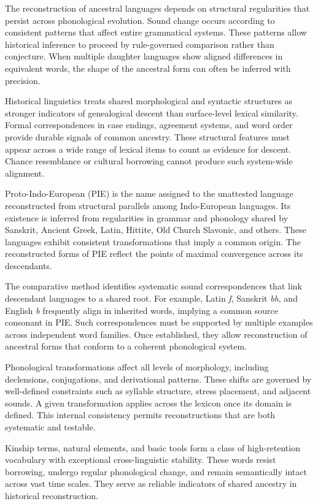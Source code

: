 
The reconstruction of ancestral languages depends on structural regularities that persist across phonological evolution. Sound change occurs according to consistent patterns that affect entire grammatical systems. These patterns allow historical inference to proceed by rule-governed comparison rather than conjecture. When multiple daughter languages show aligned differences in equivalent words, the shape of the ancestral form can often be inferred with precision.

Historical linguistics treats shared morphological and syntactic structures as stronger indicators of genealogical descent than surface-level lexical similarity. Formal correspondences in case endings, agreement systems, and word order provide durable signals of common ancestry. These structural features must appear across a wide range of lexical items to count as evidence for descent. Chance resemblance or cultural borrowing cannot produce such system-wide alignment.

Proto-Indo-European (PIE) is the name assigned to the unattested language reconstructed from structural parallels among Indo-European languages. Its existence is inferred from regularities in grammar and phonology shared by Sanskrit, Ancient Greek, Latin, Hittite, Old Church Slavonic, and others. These languages exhibit consistent transformations that imply a common origin. The reconstructed forms of PIE reflect the points of maximal convergence across its descendants.

The comparative method identifies systematic sound correspondences that link descendant languages to a shared root. For example, Latin \emph{f}, Sanskrit \emph{bh}, and English \emph{b} frequently align in inherited words, implying a common source consonant in PIE. Such correspondences must be supported by multiple examples across independent word families. Once established, they allow reconstruction of ancestral forms that conform to a coherent phonological system.

Phonological transformations affect all levels of morphology, including declensions, conjugations, and derivational patterns. These shifts are governed by well-defined constraints such as syllable structure, stress placement, and adjacent sounds. A given transformation applies across the lexicon once its domain is defined. This internal consistency permits reconstructions that are both systematic and testable.

Kinship terms, natural elements, and basic tools form a class of high-retention vocabulary with exceptional cross-linguistic stability. These words resist borrowing, undergo regular phonological change, and remain semantically intact across vast time scales. They serve as reliable indicators of shared ancestry in historical reconstruction.

